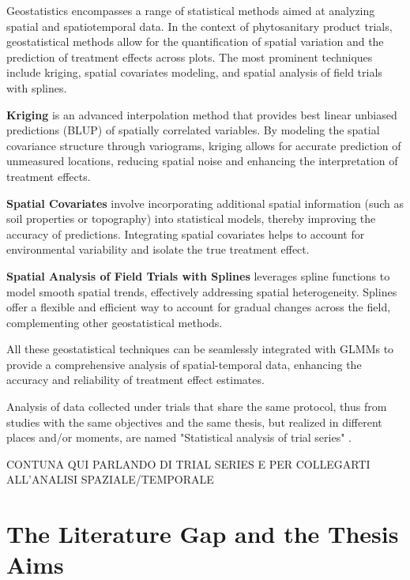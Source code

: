 \documentclass[12pt,a4paper,oneside]{report}
\begin{document}
Geostatistics encompasses a range of statistical methods aimed at analyzing
spatial and spatiotemporal data. In the context of phytosanitary product trials,
geostatistical methods allow for the quantification of spatial variation and the
prediction of treatment effects across plots. The most prominent techniques
include kriging, spatial covariates modeling, and spatial analysis of field trials
with splines.

\textbf{Kriging} is an advanced interpolation method that provides best linear
unbiased predictions (BLUP) of spatially correlated variables. By modeling the
spatial covariance structure through variograms, kriging allows for accurate
prediction of unmeasured locations, reducing spatial noise and enhancing the
interpretation of treatment effects.

\textbf{Spatial Covariates} involve incorporating additional spatial information
(such as soil properties or topography) into statistical models, thereby
improving the accuracy of predictions. Integrating spatial covariates helps to
account for environmental variability and isolate the true treatment effect.

\textbf{Spatial Analysis of Field Trials with Splines} leverages spline functions
to model smooth spatial trends, effectively addressing spatial heterogeneity.
Splines offer a flexible and efficient way to account for gradual changes across
the field, complementing other geostatistical methods.

All these geostatistical techniques can be seamlessly integrated with GLMMs to
provide a comprehensive analysis of spatial-temporal data, enhancing the accuracy and
reliability of treatment effect estimates.

Analysis of data collected under trials that share the same protocol, thus
from studies with the same objectives and the same thesis,
but realized in different places and/or moments, 
are named "Statistical analysis of trial series" \cite{EPPO_PP1_152}.

CONTUNA QUI PARLANDO DI TRIAL SERIES E PER COLLEGARTI ALL'ANALISI SPAZIALE/TEMPORALE

\section{The Literature Gap and the Thesis Aims}


\end{document}
